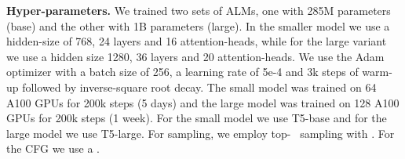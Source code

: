 {\noindent \bf{Hyper-parameters.}} We trained two sets of \ac{ALM}s, one with 285M parameters (base) and the other with 1B parameters (large). In the smaller model we use a hidden-size of 768, 24 layers and 16 attention-heads, while for the large variant we use a hidden size 1280, 36 layers and 20 attention-heads. We use the Adam optimizer with a batch size of 256, a learning rate of 5e-4 and 3k steps of warm-up followed by inverse-square root decay. The small model was trained on 64 A100 GPUs for 200k steps (5 days) and the large model was trained on 128 A100 GPUs for 200k steps (1 week). For the small model we use T5-base and for the large model we use T5-large. For sampling, we employ top-~\citep{holtzman2019curious} sampling with . For the \ac{CFG} we use a . 

\begin{table}[t!]
\centering \small
\caption{\label{tab:main_res} Results are reported for DiffSound together with several versions of \audiogen. For DiffSound data augmentation, we follow the authors suggested mask-based text generation (MBTG) strategy. For subjective tests we report overall quality (OVL), and text relevenace (REL.) together with 95\% Confidence Interval. For the objective metrics we report FAD and KL. }
\end{table}


